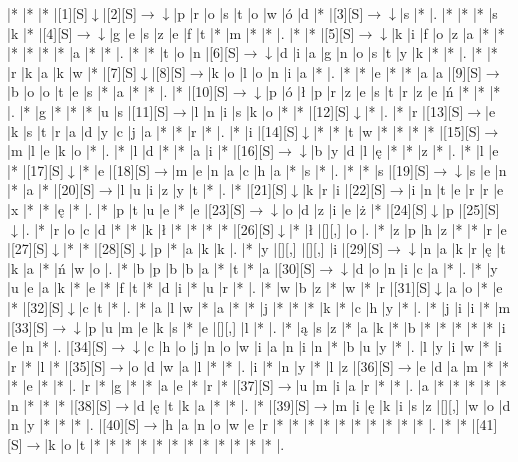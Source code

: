 \documentclass[11pt]{article}
\newcommand\drarr{$\rightarrow \!\!\!\!\! \downarrow$}
\newcommand\rarr{$\rightarrow$}
\newcommand\darr{$\downarrow$}
\begin{document}
\noindent\begin{Puzzle}{17}{31}|*	|*	|*	|[1][S]\darr	|[2][S]\drarr	|p	|r	|o	|s	|t	|o	|w	|ó	|d	|*	|[3][S]\drarr	|s	|*	|.
|*	|*	|*	|s	|k	|*	|[4][S]\drarr	|g	|e	|s	|z	|e	|f	|t	|*	|m	|*	|*	|.
|*	|*	|[5][S]\drarr	|k	|i	|f	|o	|z	|a	|*	|*	|*	|*	|*	|*	|a	|*	|*	|.
|*	|*	|t	|o	|n	|[6][S]\drarr	|d	|i	|a	|g	|n	|o	|s	|t	|y	|k	|*	|*	|.
|*	|*	|r	|k	|a	|k	|w	|*	|[7][S]\darr	|[8][S]\rarr	|k	|o	|l	|o	|n	|i	|a	|*	|.
|*	|*	|e	|*	|*	|a	|a	|[9][S]\rarr	|b	|o	|o	|t	|e	|s	|*	|a	|*	|*	|.
|*	|[10][S]\drarr	|p	|ó	|ł	|p	|r	|z	|e	|s	|t	|r	|z	|e	|ń	|*	|*	|*	|.
|*	|g	|*	|*	|*	|u	|s	|[11][S]\rarr	|l	|n	|i	|s	|k	|o	|*	|*	|[12][S]\darr	|*	|.
|*	|r	|[13][S]\rarr	|e	|k	|s	|t	|r	|a	|d	|y	|c	|j	|a	|*	|*	|r	|*	|.
|*	|i	|[14][S]\darr	|*	|*	|t	|w	|*	|*	|*	|*	|[15][S]\rarr	|m	|l	|e	|k	|o	|*	|.
|*	|l	|d	|*	|*	|a	|i	|*	|[16][S]\drarr	|b	|y	|d	|l	|ę	|*	|*	|z	|*	|.
|*	|l	|e	|*	|[17][S]\darr	|*	|e	|[18][S]\rarr	|m	|e	|n	|a	|c	|h	|a	|*	|s	|*	|.
|*	|*	|s	|[19][S]\drarr	|s	|e	|n	|*	|a	|*	|[20][S]\rarr	|l	|u	|i	|z	|y	|t	|*	|.
|*	|[21][S]\darr	|k	|r	|i	|[22][S]\rarr	|i	|n	|t	|e	|r	|r	|e	|x	|*	|*	|ę	|*	|.
|*	|p	|t	|u	|e	|*	|e	|[23][S]\drarr	|o	|d	|z	|i	|e	|ż	|*	|[24][S]\darr	|p	|[25][S]\darr	|.
|*	|r	|o	|c	|d	|*	|*	|k	|ł	|*	|*	|*	|*	|[26][S]\darr	|*	|ł	|[][,]{ }	|o	|.
|*	|z	|p	|h	|z	|*	|*	|r	|e	|[27][S]\darr	|*	|*	|[28][S]\darr	|p	|*	|a	|k	|k	|.
|*	|y	|[][,]{ }	|[][,]{ }	|i	|[29][S]\drarr	|n	|a	|k	|r	|ę	|t	|k	|a	|*	|ń	|w	|o	|.
|*	|b	|p	|b	|b	|a	|*	|t	|*	|a	|[30][S]\drarr	|d	|o	|n	|i	|c	|a	|*	|.
|*	|y	|u	|e	|a	|k	|*	|e	|*	|f	|t	|*	|d	|i	|*	|u	|r	|*	|.
|*	|w	|b	|z	|*	|w	|*	|r	|[31][S]\darr	|a	|o	|*	|e	|*	|[32][S]\darr	|c	|t	|*	|.
|*	|a	|l	|w	|*	|a	|*	|*	|j	|*	|*	|*	|k	|*	|c	|h	|y	|*	|.
|*	|j	|i	|i	|*	|m	|[33][S]\drarr	|p	|u	|m	|e	|k	|s	|*	|e	|[][,]{ }	|l	|*	|.
|*	|ą	|s	|z	|*	|a	|k	|*	|b	|*	|*	|*	|*	|*	|i	|e	|n	|*	|.
|[34][S]\drarr	|c	|h	|o	|j	|n	|o	|w	|i	|a	|n	|i	|n	|*	|b	|u	|y	|*	|.
|l	|y	|i	|w	|*	|i	|r	|*	|l	|*	|[35][S]\rarr	|o	|d	|w	|a	|l	|*	|*	|.
|i	|*	|n	|y	|*	|l	|z	|[36][S]\rarr	|e	|d	|a	|m	|*	|*	|*	|e	|*	|*	|.
|r	|*	|g	|*	|*	|a	|e	|*	|r	|*	|[37][S]\rarr	|u	|m	|i	|a	|r	|*	|*	|.
|a	|*	|*	|*	|*	|*	|n	|*	|*	|*	|[38][S]\rarr	|d	|ę	|t	|k	|a	|*	|*	|.
|*	|[39][S]\rarr	|m	|i	|ę	|k	|i	|s	|z	|[][,]{ }	|w	|o	|d	|n	|y	|*	|*	|*	|.
|[40][S]\rarr	|h	|a	|n	|o	|w	|e	|r	|*	|*	|*	|*	|*	|*	|*	|*	|*	|*	|.
|*	|*	|[41][S]\rarr	|k	|o	|t	|*	|*	|*	|*	|*	|*	|*	|*	|*	|*	|*	|*	|.\end{Puzzle}

\newpage
\end{document}
